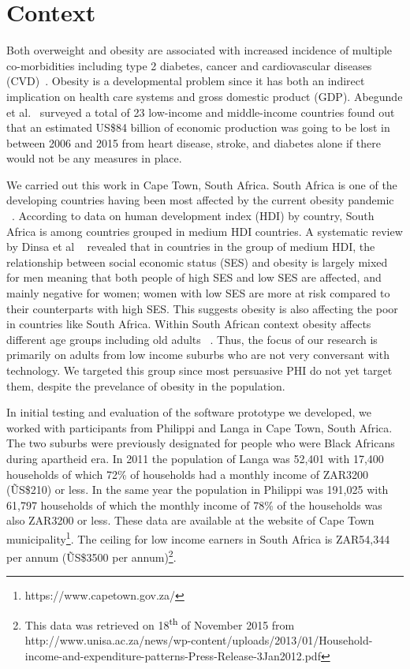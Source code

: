 \documentclass{sig-alternate}
\def\SP#1{\textsuperscript{\textcolor{black}{#1}}}
\begin{document}
\section{Context}

Both overweight and obesity are associated with increased incidence of
multiple co-morbidities including type 2 diabetes, cancer and cardiovascular
diseases (CVD)~\cite{guh2009incidence}. Obesity is a developmental problem
since it has both an indirect implication on health care systems and gross
domestic product (GDP). Abegunde et al.~\cite{abegunde:theburden} surveyed a
total of 23 low-income and middle-income countries found out that an estimated
US\$84 billion of economic production was going to be lost in between 2006 and
2015 from heart disease, stroke, and diabetes alone if there would not be any
measures in place.

We carried out this work in Cape Town, South Africa. South Africa is one of the
developing countries having been most affected by the current obesity pandemic
~\cite{ali2009factors}. According to data on human development index (HDI) by
country, South Africa is among countries grouped in medium HDI countries. A
systematic review by Dinsa et al ~\cite{dinsa2012obesity} revealed that in
countries in the group of medium HDI, the relationship between social economic
status (SES) and obesity is largely mixed for men meaning that both people of
high SES and low SES are affected,  and mainly negative for women;
women with low SES are more at risk compared to their counterparts with high
SES.  This suggests obesity is also affecting the poor in countries like South
Africa. Within South African context obesity affects different age groups
including old adults ~\cite{ali2009factors}. Thus, the focus of our research is
primarily on adults from low income suburbs who are not very conversant with
technology. We targeted this group since most persuasive PHI do not yet 
target them, despite the prevelance of obesity in the population.

In initial testing and evaluation of the software prototype we developed, we
worked with participants from Philippi and Langa in Cape Town, South Africa.
The two suburbs were previously designated for people who were Black Africans
during apartheid era. In 2011 the population of Langa was 52,401 with 17,400
households of which 72\% of households  had a monthly income of ZAR3200
(\~US\$210) or less. In the same year the population in Philippi was 191,025
with 61,797 households of which the monthly income of 78\% of the households
was also ZAR3200 or less. These data are available at the website of Cape Town
municipality\footnote{https://www.capetown.gov.za/}.    The ceiling for low
income earners in South Africa is ZAR54,344 per annum (\~US\$3500 per
annum)\footnote{This data was retrieved on 18\SP{th} of November 2015 from
http://www.unisa.ac.za/news/wp-content/uploads/2013/01/Household-
income-and-expenditure-patterns-Press-Release-3Jan2012.pdf}.
\end{document}
